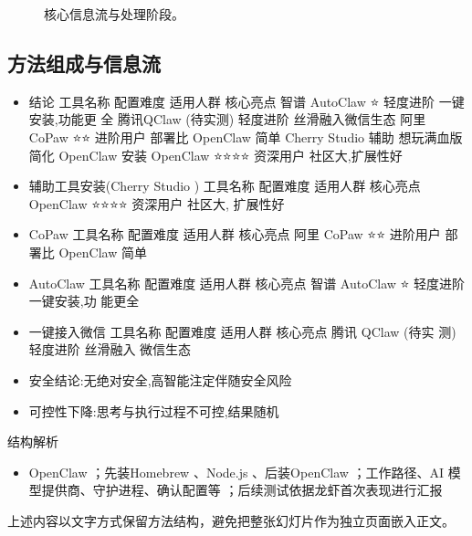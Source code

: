 \documentclass[UTF8,11pt,a4paper]{ctexart}
\begin{document}
\begin{figure}[H]
\centering
{}
\caption{核心信息流与处理阶段。}
\end{figure}

\subsection{方法组成与信息流}
\begin{itemize}
\item 结论 工具名称 配置难度 适用人群 核心亮点 智谱 AutoClaw ⭐ 轻度进阶 一键安装,功能更 全 腾讯QClaw (待实测) 轻度进阶 丝滑融入微信生态 阿里 CoPaw ⭐⭐ 进阶用户 部署比 OpenClaw 简单 Cherry Studio 辅助 想玩满血版 简化 OpenClaw 安装 OpenClaw ⭐⭐⭐⭐ 资深用户 社区大,扩展性好
\item 辅助工具安装(Cherry Studio ) 工具名称 配置难度 适用人群 核心亮点 OpenClaw ⭐⭐⭐⭐ 资深用户 社区大, 扩展性好
\item CoPaw 工具名称 配置难度 适用人群 核心亮点 阿里 CoPaw ⭐⭐ 进阶用户 部署比 OpenClaw 简单
\item AutoClaw 工具名称 配置难度 适用人群 核心亮点 智谱 AutoClaw ⭐ 轻度进阶 一键安装,功 能更全
\item 一键接入微信 工具名称 配置难度 适用人群 核心亮点 腾讯 QClaw (待实 测) 轻度进阶 丝滑融入 微信生态
\item 安全结论:无绝对安全,高智能注定伴随安全风险
\item 可控性下降:思考与执行过程不可控,结果随机
\end{itemize}

\begin{keybox}{结构解析}
\begin{itemize}
\item OpenClaw ；先装Homebrew 、Node.js 、后装OpenClaw ；工作路径、AI 模型提供商、守护进程、确认配置等 ；后续测试依据龙虾首次表现进行汇报
\end{itemize}
\end{keybox}

上述内容以文字方式保留方法结构，避免把整张幻灯片作为独立页面嵌入正文。
\end{document}
